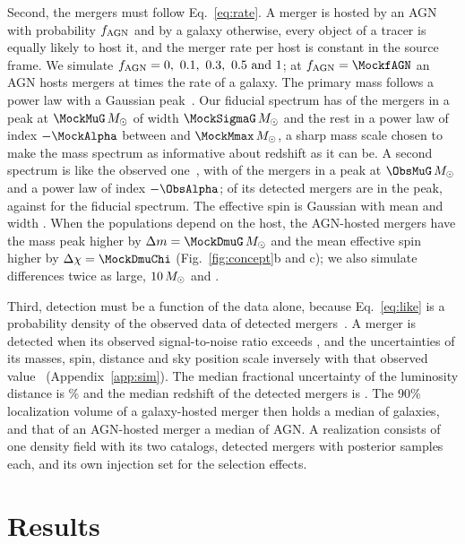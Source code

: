 \documentclass[aps,prd,reprint,amsmath,amssymb,nofootinbib]{revtex4-2}
\newcommand{\Msun}{\,M_\odot}
\newcommand{\fAGN}{f_{\rm AGN}}
\begin{document}
Second, the mergers must follow Eq.~\eqref{eq:rate}.
A merger is hosted by an AGN with probability $\fAGN$ and by a galaxy otherwise, every object of a tracer is equally likely to host it, and the merger rate per host is constant in the source frame.
We simulate $\fAGN=\IndfList$; at $\fAGN=\MockfAGN$ an AGN hosts mergers at \MockRateRatio{} times the rate of a galaxy.
The primary mass follows a power law with a Gaussian peak~\cite{Talbot:2018cva}.
Our fiducial spectrum has \MockPeakFrac{} of the mergers in a peak at $\MockMuG\Msun$ of width $\MockSigmaG\Msun$ and the rest in a power law of index $-\MockAlpha$ between \MockMmin{} and $\MockMmax\Msun$, a sharp mass scale chosen to make the mass spectrum as informative about redshift as it can be.
A second spectrum is like the observed one~\cite{KAGRA:2021duu}, with \ObsPeakFrac{} of the mergers in a peak at $\ObsMuG\Msun$ and a power law of index $-\ObsAlpha$; \ObsDetPeakShare{} of its detected mergers are in the peak, against \MockDetPeakShare{} for the fiducial spectrum.
The effective spin is Gaussian with mean \MockMuChi{} and width \MockSigmaChi.
When the populations depend on the host, the AGN-hosted mergers have the mass peak higher by $\Delta m=\MockDmuG\Msun$ and the mean effective spin higher by $\Delta\chi=\MockDmuChi$ (Fig.~\ref{fig:concept}b and c); we also simulate differences twice as large, $\IndDmTwice\Msun$ and \IndDchiTwice.

Third, detection must be a function of the data alone, because Eq.~\eqref{eq:like} is a probability density of the observed data of detected mergers~\cite{Essick:2023upv}.
A merger is detected when its observed signal-to-noise ratio exceeds \MockSNRthr, and the uncertainties of its masses, spin, distance and sky position scale inversely with that observed value~\cite{Farah:2023vsc} (Appendix~\ref{app:sim}).
The median fractional uncertainty of the luminosity distance is \MockSigLnDL\% and the median redshift of the detected mergers is \MockzMedian.
The 90\% localization volume of a galaxy-hosted merger then holds a median of \PureGalHostsPerVol{} galaxies, and that of an AGN-hosted merger a median of \PureAGNHostsPerVol{} AGN.
A realization consists of one density field with its two catalogs, \MockNev{} detected mergers with \ProdNsamp{} posterior samples each, and its own injection set for the selection effects.

\section{Results}
\label{sec:results}
\end{document}

